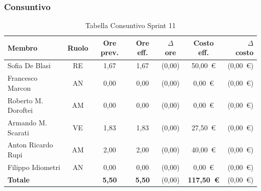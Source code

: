 \subsubsection{Consuntivo}
\begin{table}[H]
    \centering
    \renewcommand{\arraystretch}{1.3}
    \begin{tabularx}{\textwidth}{|X|c|c|c|c|c|r|}
        \hline
        \textbf{Membro} & \textbf{Ruolo} & \textbf{Ore prev.} &
        \textbf{Ore eff.} & \textbf{$\Delta$ ore} &
        \textbf{Costo eff.} & \textbf{$\Delta$ costo} \\
        \hline
        Sofia De Blasi       & RE & 1,67 & 1,67 & {\color{green}(0,00)}  & 50{,}00~\euro & {\color{green}(0{,}00~\euro)} \\
        Francesco Marcon     & AN & 0,00 & 0,00 & {\color{green}(0,00)} & 0{,}00~\euro  & {\color{green}(0{,}00~\euro)} \\
        Roberto M. Doroftei  & AM & 0,00 & 0,00 & {\color{green}(0,00)} & 0{,}00~\euro  & {\color{green}(0{,}00~\euro)} \\
        Armando M. Scarati   & VE & 1,83 & 1,83 & {\color{green}(0,00)}  & 27{,}50~\euro  & {\color{green}(0{,}00~\euro)} \\
        Anton Ricardo Rupi   & AM & 2,00 & 2,00 & {\color{green}(0,00)}  & 40{,}00~\euro & {\color{green}(0{,}00~\euro)} \\
        Filippo Idiometri    & AN & 0,00 & 0,00 & {\color{green}(0,00)} & 0{,}00~\euro  & {\color{green}(0{,}00~\euro)} \\
        \hline
        \textbf{Totale} & & \textbf{5,50} & \textbf{5,50} & {\color{green}(0,00)} & \textbf{117{,}50~\euro} & {\color{green}(0{,}00~\euro)} \\
        \hline
    \end{tabularx}
    \caption{Tabella Consuntivo Sprint 11}
\end{table}

